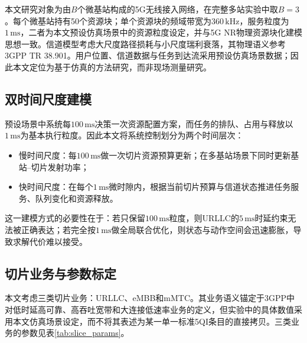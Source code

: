 \documentclass[UTF8,a4paper,12pt,fontset=fandol]{ctexart}
\begin{document}
本文研究对象为由$B$个微基站构成的5G无线接入网络，在完整多站实验中取$B=3$。每个微基站持有50个资源块；单个资源块的频域带宽为$360\,\mathrm{kHz}$，服务粒度为$1\,\mathrm{ms}$，二者为本文预设仿真场景中的资源粒度设定，并与5G NR物理资源块化建模思想一致\cite{3gpp38211}。信道模型考虑大尺度路径损耗与小尺度瑞利衰落，其物理语义参考3GPP TR 38.901\cite{3gpp38901}。用户位置、信道数据与任务到达流采用预设仿真场景数据；因此本文定位为基于仿真的方法研究，而非现场测量研究。

\subsection{双时间尺度建模}

预设场景中系统每$100\,\mathrm{ms}$决策一次资源配置方案，而任务的排队、占用与释放以$1\,\mathrm{ms}$为基本执行粒度。因此本文将系统控制划分为两个时间层次：

\begin{itemize}[leftmargin=2em]
  \item 慢时间尺度：每$100\,\mathrm{ms}$做一次切片资源预算更新；在多基站场景下同时更新基站--切片发射功率；
  \item 快时间尺度：在每个$1\,\mathrm{ms}$微时隙内，根据当前切片预算与信道状态推进任务服务、队列变化和资源释放。
\end{itemize}

这一建模方式的必要性在于：若只保留$100\,\mathrm{ms}$粒度，则URLLC的$5\,\mathrm{ms}$时延约束无法被正确表达；若完全按$1\,\mathrm{ms}$做全局联合优化，则状态与动作空间会迅速膨胀，导致求解代价难以接受。

\subsection{切片业务与参数标定}

本文考虑三类切片业务：URLLC、eMBB和mMTC。其业务语义锚定于3GPP中对低时延高可靠、高吞吐宽带和大连接低速率业务的定义\cite{3gpp23501,3gpp22261}，但实验中的具体数值采用本文仿真场景设定，而不将其表述为某一单一标准5QI条目的直接拷贝。三类业务的参数见表\ref{tab:slice_params}。

\begin{table}[htbp]
  \centering
  \caption{三类切片的业务语义与场景参数化}
  \label{tab:slice_params}
\end{table}
\end{document}
